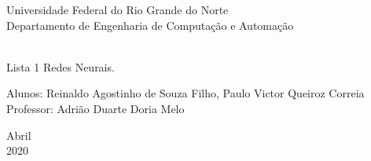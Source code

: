 \documentclass[a4paper, 12pt]{article}
\begin{document}

\begin{titlepage}
	\begin{center}
	

		\Huge{Universidade Federal do Rio Grande do Norte}\\
		\large{Departamento de Engenharia de Computação e Automação}\\ 
		\
		\vspace{15pt}
        \vspace{95pt}
        \
        
		\LARGE{Lista 1 Redes Neurais.}
		\vspace{3,5cm}
	\end{center}
	
	\begin{flushleft}
		\begin{tabbing}
			Alunos: Reinaldo Agostinho de Souza Filho, Paulo Victor Queiroz Correia\\
            Professor: Adrião Duarte Doria Melo \
	\end{tabbing}
 \end{flushleft}
	\vspace{1cm}
	
	\begin{center}
		\vspace{\fill}
			 Abril \\
		 2020
			\end{center}
\end{titlepage}

\end{document}
